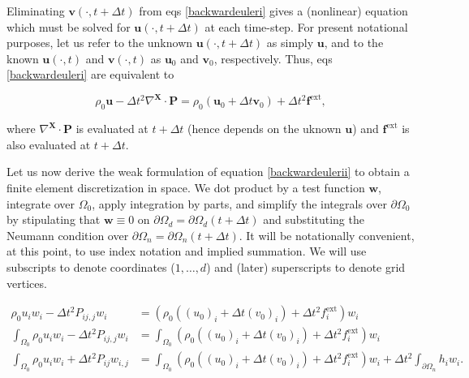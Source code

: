 \documentclass{article}
\begin{document}
Eliminating \(\mathbf{v} \left( \cdot, t + \Delta t \right)\) from eqs \eqref{backwardeuleri} gives a (nonlinear) equation which must be solved for \(\mathbf{u} \left( \cdot, t + \Delta t \right)\) at each time-step.  For present notational purposes, let us refer to the unknown \(\mathbf{u} \left( \cdot, t + \Delta t \right)\) as simply \(\mathbf{u}\), and to the known \(\mathbf{u}(\cdot,t)\) and \(\mathbf{v}(\cdot,t)\) as \(\mathbf{u}_0\) and \(\mathbf{v}_0\), respectively.  Thus, eqs \eqref{backwardeuleri} are equivalent to

\begin{equation}\label{backwardeulerii}
\rho_0 \mathbf{u} - \Delta t^2 \nabla^{\mathbf{X}} \cdot \mathbf{P} = \rho_0 \left( \mathbf{u}_0 + \Delta t \mathbf{v}_0 \right) + \Delta t^2 \mathbf{f}^{\text{ext}},
\end{equation}

where \(\nabla^{\mathbf{X}} \cdot \mathbf{P}\) is evaluated at \(t + \Delta t\) (hence depends on the uknown \(\mathbf{u}\)) and \(\mathbf{f}^{\text{ext}}\) is also evaluated at \(t + \Delta t\).

Let us now derive the weak formulation of equation \eqref{backwardeulerii} to obtain a finite element discretization in space.  We dot product by a test function \(\mathbf{w}\), integrate over \(\Omega_0\), apply integration by parts, and simplify the integrals over \(\partial \Omega_0\) by stipulating that \(\mathbf{w} \equiv 0\) on \(\partial \Omega_d = \partial \Omega_d(t + \Delta t)\) and substituting the Neumann condition over \(\partial \Omega_n = \partial \Omega_n(t + \Delta t)\).  It will be notationally convenient, at this point, to use index notation and implied summation.  We will use subscripts to denote coordinates (\(1, \dotsc, d\)) and (later) superscripts to denote grid vertices.

\begin{subequations}
\begin{align}
\rho_0 u_i w_i - \Delta t^2 P_{ij,j} w_i & = \left( \rho_0 \left( (u_0)_i + \Delta t (v_0)_i \right) + \Delta t^2 f^{\text{ext}}_i \right) w_i \\
\int_{\Omega_0} \rho_0 u_i w_i - \Delta t^2 P_{ij,j} w_i & = \int_{\Omega_0} \left( \rho_0 \left( (u_0)_i + \Delta t (v_0)_i \right) + \Delta t^2 f^{\text{ext}}_i \right) w_i \\
\int_{\Omega_0} \rho_0 u_i w_i + \Delta t^2 P_{ij} w_{i,j} & = \int_{\Omega_0} \left( \rho_0 \left( (u_0)_i + \Delta t (v_0)_i \right) + \Delta t^2 f^{\text{ext}}_i \right) w_i + \Delta t^2 \int_{\partial \Omega_n} h_i w_i. \label{weak}
\end{align}
\end{subequations}
\end{document}
